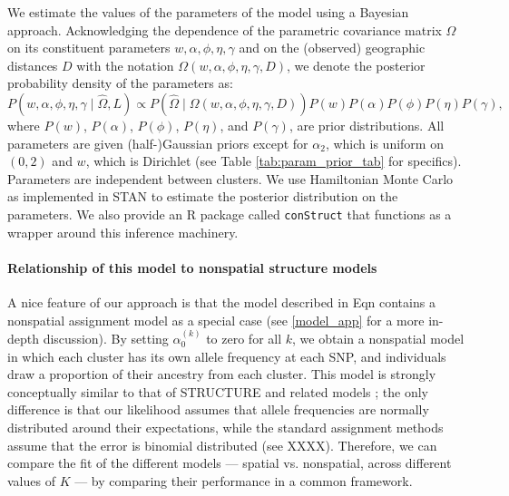 \documentclass[12pt]{article}
\begin{document}
We estimate the values of the parameters of the model using a Bayesian approach.
Acknowledging the dependence of the parametric covariance matrix $\Omega$ on its constituent parameters
$w,\alpha,\phi,\eta,\gamma$ and on the (observed) geographic distances $D$ 
with the notation $\Omega(w,\alpha,\phi,\eta,\gamma,D)$,
we denote the posterior probability density of the parameters as:
\begin{equation}
P\left( w,\alpha,\phi,\eta,\gamma \;	| \; \widehat{\Omega}, L \right) \propto
P\left(\widehat{\Omega} \; | \; \Omega(w,\alpha,\phi,\eta,\gamma,D) \right)
P(w)P(\alpha)P(\phi)P(\eta)P(\gamma) ,
\end{equation}
where $P(w)$, $P(\alpha)$, $P(\phi)$, $P(\eta)$, and $P(\gamma)$, are prior distributions.
All parameters are given (half-)Gaussian priors except for $\alpha_2$, which is uniform on $(0,2)$ and $w$, which is Dirichlet
(see Table \ref{tab:param_prior_tab} for specifics).
Parameters are independent between clusters.
We use Hamiltonian Monte Carlo as implemented in STAN \citep{stan, NUTS, stan_lib, rstan} 
to estimate the posterior distribution on the parameters.
We also provide an R package \citep{R} called \texttt{conStruct} that functions as a wrapper 
around this inference machinery.


\paragraph{Relationship of this model to nonspatial structure models}

A nice feature of our approach is that the model described in Eqn  
contains a nonspatial assignment model as a special case 
(see \ref{model_app} for a more in-depth discussion). 
By setting $\alpha_0^{(k)}$ to zero for all $k$, 
we obtain a nonspatial model in which each cluster has its own allele frequency at each SNP, 
and individuals draw a proportion of their ancestry from each cluster. 
This model is strongly conceptually similar to that of STRUCTURE \citep{STRUCTURE} 
and related models \citep[e.g.][]{ADMIXTURE}; 
the only difference is that our likelihood assumes that allele frequencies are normally distributed 
around their expectations, 
while the standard assignment methods assume that the error is binomial distributed (see XXXX).  
Therefore, we can compare the fit of the different models 
--- spatial vs. nonspatial, across different values of $K$ --- 
by comparing their performance in a common framework.
\end{document}
